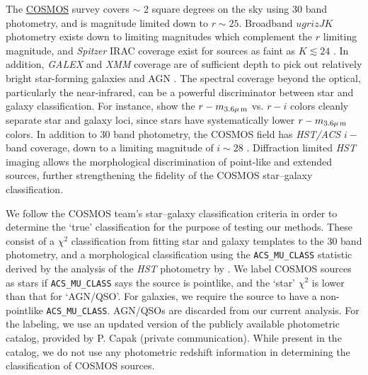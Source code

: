 \documentclass[12pt,preprint]{aastex}
\begin{document}
The \href{http://cosmos.astro.caltech.edu/}{COSMOS} survey 
\citep{scoville07a} covers $\sim$ 2 square degrees on
the sky using 30 band photometry, and is magnitude limited down to $r
\sim 25$.  Broadband $ugrizJK$ photometry exists down to limiting
magnitudes which complement the $r$ limiting magnitude, and {\it
  Spitzer} IRAC coverage exist for sources as faint as $K\lesssim24$ 
  \citep{capak07,sanders07,taniguchi07}.
In addition, {\it GALEX} and {\it XMM} coverage are of sufficient
depth to pick out relatively bright star-forming galaxies and AGN 
\citep{hasinger07,zamojski07}.
The spectral coverage beyond the optical, particularly the
near-infrared, can be a powerful discriminator between star and
galaxy classification.  For instance, \citet{ilbert09} show the
$r-m_{\rm 3.6\mu\,m}$ vs. $r-i$ colors cleanly separate star and
galaxy loci, since stars have systematically lower $r-m_{\rm
  3.6\mu\,m}$ colors.  In addition to 30 band photometry, the COSMOS
field has \textit{HST/ACS} $i-$band coverage, down to a limiting
magnitude of $i\sim28$ \citep{koekemoer07,scoville07b}.  Diffraction
limited \textit{HST} imaging allows the morphological discrimination
of point-like and extended sources, further strengthening the fidelity
of the COSMOS star--galaxy classification.

We follow the COSMOS team's star--galaxy classification criteria 
in order to determine the `true' classification for the purpose of 
testing our methods.  These consist of a $\chi^2$ classification 
from fitting star and galaxy templates to the 30 band photometry, 
and a morphological classification using the 
{\tt ACS\_MU\_CLASS} statistic derived by the analysis of the 
\textit{HST} photometry by \citet{scarlata07}.   We label COSMOS
sources as stars if {\tt ACS\_MU\_CLASS} says the source is pointlike, 
and the `star' $\chi^2$ is lower than that for `AGN/QSO'.  For galaxies, 
we require the source to have a non-pointlike {\tt ACS\_MU\_CLASS}.  
AGN/QSOs are discarded from our current analysis.  For the labeling, we 
use an updated version of the publicly available photometric catalog, 
provided by P. Capak (private communication).  While present in the catalog, 
we do not use any photometric redshift information in determining the 
classification of COSMOS sources.
\end{document}
